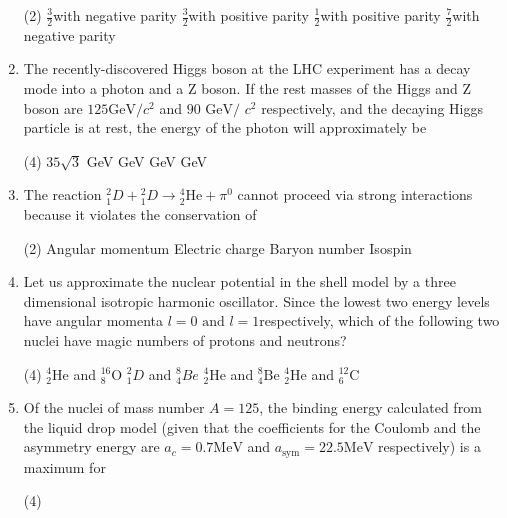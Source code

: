 \begin{enumerate}
	{	}
	\begin{tasks}(2)
		\task[\textbf{A.}] $\frac{3}{2}$with negative parity
		\task[\textbf{B.}] $\frac{3}{2}$with positive parity
		\task[\textbf{C.}] $\frac{1}{2}$with positive parity
		\task[\textbf{D.}] $\frac{7}{2}$with negative parity
	\end{tasks}
	\item 	The recently-discovered Higgs boson at the LHC experiment has a decay mode into a photon and a Z boson. If the rest masses of the Higgs and Z boson are $125 \text{GeV/}c ^2$ and $90\text{ GeV/ }c^2$ respectively, and the decaying Higgs particle is at rest, the energy of the photon will approximately be
	{}
	\begin{tasks}(4)
		\task[\textbf{A.}] $35\sqrt{3}$ GeV
		 GeV
		 GeV
		 GeV
	\end{tasks}
	\item 	The reaction ${ }_{1}^{2} D+{ }_{1}^{2} D \rightarrow{ }_{2}^{4} \mathrm{He}+\pi^{0}$ cannot proceed via strong interactions because it violates the conservation of
	{}
	\begin{tasks}(2)
		\task[\textbf{A.}] Angular momentum
		\task[\textbf{B.}] Electric charge
		\task[\textbf{C.}]  Baryon number
		\task[\textbf{D.}] Isospin
	\end{tasks}
	\item Let us approximate the nuclear potential in the shell model by a three dimensional isotropic harmonic oscillator. Since the lowest two energy levels have angular momenta $l = 0\text{ and }l = 1 $respectively, which of the following two nuclei have magic numbers of
	protons and neutrons?
	{	}
	\begin{tasks}(4)
		\task[\textbf{A.}] ${ }_{2}^{4} \mathrm{He}$ and ${ }_{8}^{16} \mathrm{O}$
		\task[\textbf{B.}] ${ }_{1}^{2} D$ and ${ }_{4}^{8} B e$
		\task[\textbf{C.}]  ${ }_{2}^{4} \mathrm{He}$ and ${ }_{4}^{8} \mathrm{Be}$
		\task[\textbf{D.}] ${ }_{2}^{4} \mathrm{He}$ and ${ }_{6}^{12} \mathrm{C}$
	\end{tasks}
	\item 	Of the nuclei of mass number $A=125$, the binding energy calculated from the liquid drop model (given that the coefficients for the Coulomb and the asymmetry energy are $a_{c}=0.7 \mathrm{MeV}$ and $a_{\mathrm{sym}}=22.5 \mathrm{MeV}$ respectively) is a maximum for
	{}
	\begin{tasks}(4)

\end{tasks}
\end{enumerate}

